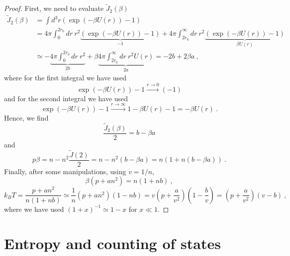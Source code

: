     \begin{proof}
        First, we need to evaluate $\tilde J_2 (\beta)$ 
        \begin{equation*}
        \begin{aligned}
            \tilde J_2 (\beta) & = \int d^3 r (\exp(- \beta U(r)) - 1) \\ & = 4 \pi \int_0^{2r_0} dr ~ r^2 \underbrace{(\exp(- \beta U(r)) - 1)}_{-1} + 4\pi \int_{2r_0}^\infty dr ~ r^2\underbrace{(\exp(- \beta U(r)) - 1)}_{\beta U(r)} \\ & \simeq - \underbrace{4 \pi \int_0^{2r_0} dr ~ r^2}_{2b} + \beta \underbrace{4\pi \int_{2r_0}^\infty dr ~ r^2 U(r)}_{2 a} = - 2 b + 2 \beta a ~,
        \end{aligned}
        \end{equation*}
        where for the first integral we have used 
        \begin{equation*}
            \exp(-\beta U(r)) - 1 \xrightarrow{r \rightarrow 0} (-1) 
        \end{equation*}
        and for the second integral we have used 
        \begin{equation*}
            \exp(-\beta U(r)) - 1 \xrightarrow{r \rightarrow \infty} 1 - \beta U(r) - 1 = - \beta U(r) ~.
        \end{equation*}
        Hence, we find
        \begin{equation*}
            \frac{\tilde J_2(\beta)}{2} = b - \beta a 
        \end{equation*}
        and 
        \begin{equation*}
            p \beta = n - n^2 \frac{\tilde J(2)}{2} = n - n^2 (b - \beta a) = n( 1 + n (b - \beta a)) ~.
        \end{equation*}
        Finally, after some manipulations, using $v = 1 / n$,
        \begin{equation*}
            \beta (p + a n^2) = n (1 + n b) ~,
        \end{equation*}
        \begin{equation*}
            k_B T = \frac{p + a n^2}{n (1 + n b)} \simeq \frac{1}{n}(p + a n^2) (1 - n b) = v (p + \frac{a}{v^2}) (1 - \frac{b}{v}) = (p + \frac{a}{v^2}) (v - b) ~,
        \end{equation*}
        where we have used $(1 + x)^{-1} \simeq 1 - x$ for $x \ll 1$.
    \end{proof}

\chapter{Entropy and counting of states}

